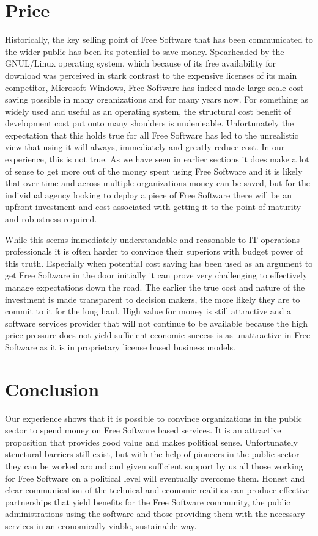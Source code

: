 \section*{Price}

Historically, the key selling point of Free Software that has been communicated
to the wider public has been its potential to save money. Spearheaded by the
GNUL/Linux operating system, which because of its free availability for
download was perceived in stark contrast to the expensive licenses of its main
competitor, Microsoft Windows, Free Software has indeed made large scale cost
saving possible in many organizations and for many years now. For something as
widely used and useful as an operating system, the structural cost benefit of
development cost put onto many shoulders is undenieable.  Unfortunately the
expectation that this holds true for all Free Software has led to the
unrealistic view that using it will always, immediately and greatly reduce
cost. In our experience, this is not true. As we have seen in earlier sections
it does make a lot of sense to get more out of the money spent using Free
Software and it is likely that over time and across multiple organizations
money can be saved, but for the individual agency looking to deploy a piece of
Free Software there will be an upfront investment and cost associated with
getting it to the point of maturity and robustness required.

While this seems immediately understandable and reasonable to IT operations
professionals it is often harder to convince their superiors with budget power
of this truth. Especially when potential cost saving has been used as an
argument to get Free Software in the door initially it can prove very
challenging to effectively manage expectations down the road. The earlier the
true cost and nature of the investment is made transparent to decision makers,
the more likely they are to commit to it for the long haul. High value
for money is still attractive and a software services provider that will
not continue to be available because the high price pressure does not yield
sufficient economic success is as unattractive in Free Software as it is in
proprietary license based business models.

\section*{Conclusion}

Our experience shows that it is possible to convince organizations in
the public sector to spend money on Free Software based services. It is
an attractive proposition that provides good value and makes political
sense. Unfortunately structural barriers still exist, but with the help
of pioneers in the public sector they can be worked around and given
sufficient support by us all those working for Free Software on a political
level will eventually overcome them. Honest and clear
communication of the technical and economic realities can produce
effective partnerships that yield benefits for the Free Software community,
the public administrations using the software and those providing them
with the necessary services in an economically viable, sustainable way.
